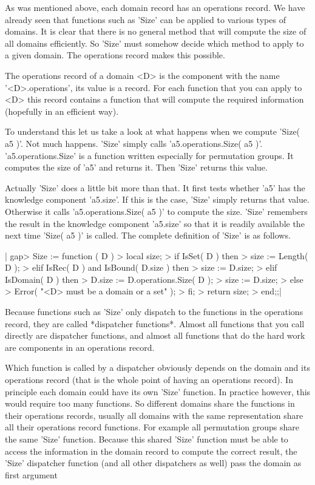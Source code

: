 As was mentioned above, each domain record has an operations  record.  We
have already seen that functions such as 'Size' can be applied to various
types of domains.  It is clear that there  is no general method that will
compute  the size  of all  domains efficiently.   So 'Size'  must somehow
decide which method to  apply to  a given  domain.  The operations record
makes this possible.

The operations  record of a domain  <D>  is the component  with  the name
'<D>.operations', its value is a record.  For each function that  you can
apply  to <D> this  record contains  a  function  that will  compute  the
required information (hopefully in an efficient way).

To understand  this let us take  a  look at what happens  when we compute
'Size(    a5   )'.    Not    much   happens.     'Size'   simply    calls
'a5.operations.Size(  a5 )'.  'a5.operations.Size'  is a function written
especially for permutation groups.   It computes  the size  of  'a5'  and
returns it.  Then 'Size' returns this value.

Actually 'Size' does a little bit more than that.  It first tests whether
'a5' has the knowledge component 'a5.size'.  If this is  the case, 'Size'
simply returns that value.  Otherwise it calls 'a5.operations.Size( a5 )'
to  compute   the size.  'Size'  remembers   the result in  the knowledge
component 'a5.size' so that it is readily available the  next time 'Size(
a5 )' is called.  The complete definition of 'Size' is as follows.

|    gap> Size := function ( D )
    >     local  size;
    >     if IsSet( D )  then
    >         size := Length( D );
    >     elif IsRec( D ) and IsBound( D.size )  then
    >         size := D.size;
    >     elif IsDomain( D )  then
    >         D.size := D.operations.Size( D );
    >         size := D.size;
    >     else
    >         Error( "<D> must be a domain or a set" );
    >     fi;
    >     return size;
    > end;;|

Because  functions such as 'Size'  only  dispatch to the functions in the
operations record, they  are called  *dispatcher functions*.  Almost  all
functions that you call directly are dispatcher functions, and almost all
functions that do the hard work are components in an operations record.

Which function is called by a dispatcher obviously depends on  the domain
and its  operations  record  (that  is  the  whole  point  of  having  an
operations record).  In principle each domain could  have  its own 'Size'
function.  In  practice however, this would  require too many  functions.
So  different domains share the functions  in  their operations  records,
usually  all  domains  with  the  same  representation  share  all  their
operations record  functions.  For example all  permutation  groups share
the same 'Size' function.  Because this  shared  'Size' function must  be
able  to access  the  information in  the  domain  record to compute  the
correct result, the 'Size' dispatcher function (and all other dispatchers
as well) pass the domain as first argument

